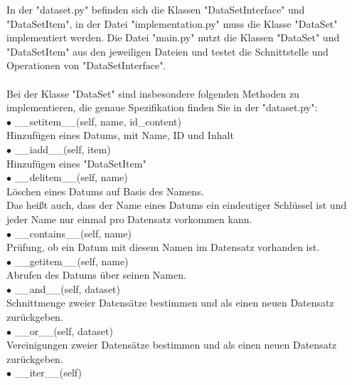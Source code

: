 \documentclass[
oneside,
12pt,
a4paper,
parskip=full
]{scrartcl}
\begin{document}
In der "dataset.py" befinden sich die Klassen "DataSetInterface" und "DataSetItem",
in der Datei "implementation.py" muss die Klasse "DataSet" implementiert werden.
Die Datei "main.py" nutzt die Klassen "DataSet" und "DataSetItem" aus den jeweiligen Dateien und testet die Schnittstelle und Operationen von "DataSetInterface".\\
\\
Bei der Klasse "DataSet" sind insbesondere folgenden Methoden zu implementieren, die genaue Spezifikation finden Sie in der "dataset.py":\\
$\bullet$ \_\_setitem\_\_(self, name, id\_content)\\
\hspace*{1cm} Hinzufügen eines Datums, mit Name, ID und Inhalt\\
$\bullet$ \_\_iadd\_\_(self, item)\\
\hspace*{1cm} Hinzufügen eines "DataSetItem"\\
$\bullet$ \_\_delitem\_\_(self, name)\\
\hspace*{1cm} Löschen eines Datums auf Basis des Namens.\\
\hspace*{1cm} Das heißt auch, dass der Name eines Datums ein eindeutiger Schlüssel ist und jeder Name nur einmal pro Datensatz vorkommen kann.\\
$\bullet$ \_\_contains\_\_(self, name)\\
\hspace*{1cm} Prüfung, ob ein Datum mit diesem Namen im Datensatz vorhanden ist.\\
$\bullet$ \_\_getitem\_\_(self, name)\\
\hspace*{1cm} Abrufen des Datums über seinen Namen.\\ 
$\bullet$ \_\_and\_\_(self, dataset)\\
\hspace*{1cm} Schnittmenge zweier Datensätze bestimmen und als einen neuen Datensatz zurückgeben.\\
$\bullet$ \_\_or\_\_(self, dataset)\\
\hspace*{1cm} Vereinigungen zweier Datensätze bestimmen und als einen neuen Datensatz zurückgeben.\\
$\bullet$ \_\_iter\_\_(self)\\
\end{document}
